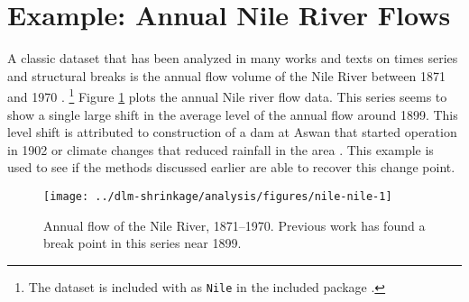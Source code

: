 

\section{Example: Annual Nile River Flows}
\label{dlm:sec:nile}

A classic dataset that has been analyzed in many works and texts on times series and structural breaks is the annual flow volume of the Nile River between 1871 and 1970 \parencites{Cobb1978}{Balke1993}{DeJongPenzer1998}{}{DurbinKoopman2012}{CommandeurKoopmanOoms2011}.%
\footnote{The dataset is included with \RLang{} as \texttt{Nile} in the included package .}
Figure \ref{dlm:fig:nile} plots the annual Nile river flow data.
This series seems to show a single large shift in the average level of the annual flow around 1899.
This level shift is attributed to construction of a dam at Aswan that started operation in 1902 or climate changes that reduced rainfall in the area \parencite[278]{Cobb1978}.
This example is used to see if the methods discussed earlier are able to recover this change point.

\begin{figure}
  \centering
  \texttt{[image: ../dlm-shrinkage/analysis/figures/nile-nile-1]}
  \caption[Annual flow of the Nile River, 1871--1970]{Annual flow of the Nile River, 1871--1970. Previous work has found a break point in this series near 1899.}
  \label{dlm:fig:nile}
\end{figure}

